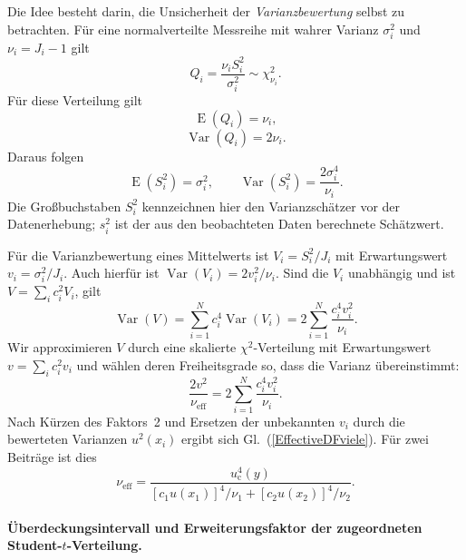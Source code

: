 Die Idee besteht darin, die Unsicherheit der \emph{Varianzbewertung}
selbst zu betrachten. Für eine normalverteilte Messreihe mit wahrer
Varianz $\sigma_i^2$ und $\nu_i=J_i-1$ gilt
\begin{equation}
Q_i=\frac{\nu_i S_i^2}{\sigma_i^2}\sim\chi^2_{\nu_i}.
\end{equation}
Für diese Verteilung gilt
\begin{equation}
\operatorname E(Q_i)=\nu_i,
\label{ErwartungswertQ}
\end{equation}
\begin{equation}
\operatorname{Var}(Q_i)=2\nu_i.
\label{VarianzQ}
\end{equation}
Daraus folgen
\begin{equation}
\operatorname E(S_i^2)=\sigma_i^2,\qquad
\operatorname{Var}(S_i^2)=\frac{2\sigma_i^4}{\nu_i}.
\end{equation}
Die Großbuchstaben $S_i^2$ kennzeichnen hier den Varianzschätzer vor der
Datenerhebung; $s_i^2$ ist der aus den beobachteten Daten berechnete
Schätzwert.

Für die Varianzbewertung eines Mittelwerts ist
$V_i=S_i^2/J_i$ mit Erwartungswert $v_i=\sigma_i^2/J_i$. Auch hierfür ist
$\operatorname{Var}(V_i)=2v_i^2/\nu_i$.
Sind die $V_i$ unabhängig und ist $V=\sum_i c_i^2V_i$, gilt
\begin{equation}
\operatorname{Var}(V)=\sum_{i=1}^N c_i^4\operatorname{Var}(V_i)
=2\sum_{i=1}^N\frac{c_i^4v_i^2}{\nu_i}.
\label{VarianzvarianzSumme}
\end{equation}
Wir approximieren $V$ durch eine skalierte $\chi^2$-Verteilung mit
Erwartungswert $v=\sum_i c_i^2v_i$ und wählen deren Freiheitsgrade so,
dass die Varianz übereinstimmt:
\begin{equation}
\frac{2v^2}{\nu_{\mathrm{eff}}}
=2\sum_{i=1}^N\frac{c_i^4v_i^2}{\nu_i}.
\label{Satterthwaite}
\end{equation}
Nach Kürzen des Faktors~2 und Ersetzen der unbekannten $v_i$ durch die
bewerteten Varianzen $u^2(x_i)$ ergibt sich
Gl.~(\ref{EffectiveDFviele}). Für zwei Beiträge ist dies
\begin{equation}
\nu_{\mathrm{eff}}=
\frac{u_{\mathrm c}^4(y)}{
[c_1u(x_1)]^4/\nu_1+[c_2u(x_2)]^4/\nu_2}.
\label{EffectiveDFfuer2}
\end{equation}

\paragraph{Überdeckungsintervall und Erweiterungsfaktor
der zugeordneten Student-$t$-Verteilung.}

